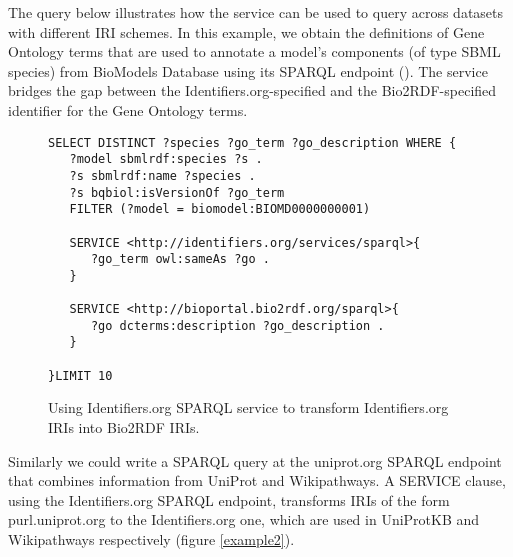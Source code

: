 \documentclass{bioinfo}
\begin{document}
The query below illustrates how the service can be used to query across datasets with different IRI schemes. In this example, we obtain the definitions of Gene Ontology terms that are used to annotate a model's components (of type SBML species) from BioModels Database using its SPARQL endpoint (\cite{Wimalaratne2014}). The service bridges the gap between the Identifiers.org-specified and the Bio2RDF-specified identifier for the Gene Ontology terms.

\begin{figure}[h]
{\scriptsize
\begin{verbatim}
SELECT DISTINCT ?species ?go_term ?go_description WHERE {
   ?model sbmlrdf:species ?s . 
   ?s sbmlrdf:name ?species .
   ?s bqbiol:isVersionOf ?go_term 
   FILTER (?model = biomodel:BIOMD0000000001)

   SERVICE <http://identifiers.org/services/sparql>{
      ?go_term owl:sameAs ?go .
   }

   SERVICE <http://bioportal.bio2rdf.org/sparql>{
      ?go dcterms:description ?go_description .
   }
   
}LIMIT 10
\end{verbatim}
}
\caption{Using Identifiers.org SPARQL service to transform Identifiers.org IRIs into Bio2RDF IRIs.}
\label{example1}
\end{figure}

Similarly we could write a SPARQL query at the uniprot.org SPARQL endpoint that combines information from UniProt and Wikipathways. A SERVICE clause, using the Identifiers.org SPARQL endpoint, transforms IRIs of the form purl.uniprot.org to the Identifiers.org one, which are used in UniProtKB and Wikipathways respectively (figure \ref{example2}).
\end{document}

